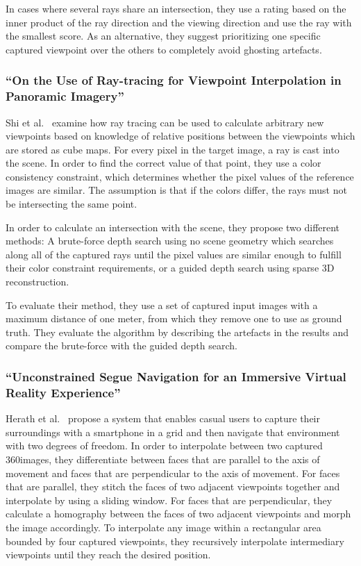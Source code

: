 In cases where several rays share an intersection, they use a rating based on the inner product of the ray direction and the viewing direction and use the ray with the smallest score. As an alternative, they suggest prioritizing one specific captured viewpoint over the others to completely avoid ghosting artefacts.

\subsubsection{``On the Use of Ray-tracing for Viewpoint Interpolation in Panoramic Imagery'' \cite{raytracing}}
Shi et al.\ \cite{raytracing} examine how ray tracing can be used to calculate arbitrary new viewpoints based on knowledge of relative positions between the viewpoints which are stored as cube maps. For every pixel in the target image, a ray is cast into the scene. In order to find the correct value of that point, they use a color consistency constraint, which determines whether the pixel values of the reference images are similar. The assumption is that if the colors differ, the rays must not be intersecting the same point.

In order to calculate an intersection with the scene, they propose two different methods: A brute-force depth search using no scene geometry which searches along all of the captured rays until the pixel values are similar enough to fulfill their color constraint requirements, or a guided depth search using sparse 3D reconstruction.

To evaluate their method, they use a set of captured input images with a maximum distance of one meter, from which they remove one to use as ground truth. They evaluate the algorithm by describing the artefacts in the results and compare the brute-force with the guided depth search.

\subsubsection{``Unconstrained Segue Navigation for an Immersive Virtual Reality Experience'' \cite{segue}}
Herath et al.\ \cite{segue} propose a system that enables casual users to capture their surroundings with a smartphone in a grid and then navigate that environment with two degrees of freedom. In order to interpolate between two captured 360\degree images, they differentiate between faces that are parallel to the axis of movement and faces that are perpendicular to the axis of movement. For faces that are parallel, they stitch the faces of two adjacent viewpoints together and interpolate by using a sliding window. For faces that are perpendicular, they calculate a homography between the faces of two adjacent viewpoints and morph the image accordingly. To interpolate any image within a rectangular area bounded by four captured viewpoints, they recursively interpolate intermediary viewpoints until they reach the desired position.

